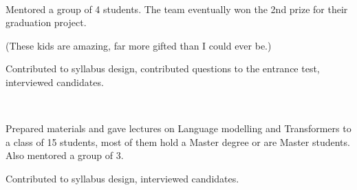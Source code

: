 \\
\begin{zitemize}
    \item Mentored a group of 4 students. The team eventually won the 2nd prize for their graduation project.
    \item (These kids are amazing, far more gifted than I could ever be.)
    \item Contributed to syllabus design, contributed questions to the entrance test, interviewed candidates.
\end{zitemize}

\\
\begin{zitemize}
    \item Prepared materials and gave lectures on Language modelling and Transformers to a class of 15 students, most of them hold a Master degree or are Master students. Also mentored a group of 3.
    \item Contributed to syllabus design, interviewed candidates.
\end{zitemize}